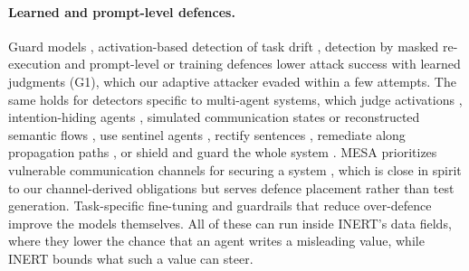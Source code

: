 \documentclass[pdflatex,sn-mathphys-num]{sn-jnl}
\theoremstyle{thmstyleone}%
\theoremstyle{thmstyletwo}%
\theoremstyle{thmstylethree}%
\begin{document}
\paragraph{Learned and prompt-level defences.} Guard models \citep{inan2023llamaguard,li2025piguard}, activation-based detection of task drift \citep{abdelnabi2025drift}, detection by masked re-execution \citep{zhu2025melon} and prompt-level or training defences \citep{hines2024spotlighting,chen2025struq,wallace2024hierarchy,chen2025secalign} lower attack success with learned judgments (G1), which our adaptive attacker evaded within a few attempts. The same holds for detectors specific to multi-agent systems, which judge activations \citep{Xu2026WhenAGQ}, intention-hiding agents \citep{Xie2025WhosTMAI}, simulated communication states \citep{Shi2026SAIGuardCSN} or reconstructed semantic flows \citep{Cai2026CrossLayerSFBK}, use sentinel agents \citep{Gosmar2025SentinelAFAJ}, rectify sentences \citep{Luo2026DefendingLMV}, remediate along propagation paths \citep{Yan2026PropGuardSLAE}, or shield and guard the whole system \citep{Wang2025MASShieldADAF,Kachuee2026MASGuardUGW}. MESA prioritizes vulnerable communication channels for securing a system \citep{Li2026MESAPVAS}, which is close in spirit to our channel-derived obligations but serves defence placement rather than test generation. Task-specific fine-tuning \citep{Piet2023JatmoPIAS} and guardrails that reduce over-defence \citep{Li2024InjecGuardBABC} improve the models themselves. All of these can run inside INERT's data fields, where they lower the chance that an agent writes a misleading value, while INERT bounds what such a value can steer.
\end{document}
